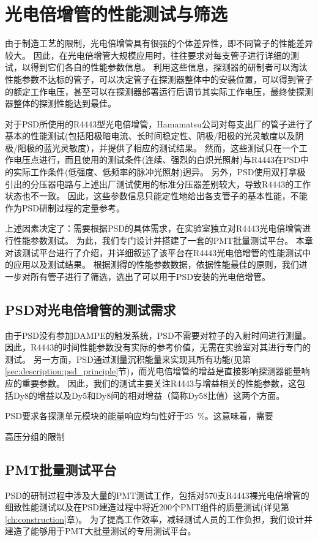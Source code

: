 \chapter{光电倍增管的性能测试与筛选}
\label{ch:pmt_test}
由于制造工艺的限制，光电倍增管具有很强的个体差异性，即不同管子的性能差异较大。
因此，在光电倍增管大规模应用时，往往要求对每支管子进行详细的测试，以得到它们各自的性能参数信息。
利用这些信息，探测器的研制者可以淘汰性能参数不达标的管子，可以决定管子在探测器整体中的安装位置，可以得到管子的额定工作电压，甚至可以在探测器部署运行后调节其实际工作电压，最终使探测器整体的探测性能达到最佳。

对于PSD所使用的R4443型光电倍增管，Hamamatsu公司对每支出厂的管子进行了基本的性能测试(包括阳极暗电流、长时间稳定性、阴极/阳极的光灵敏度以及阴极/阳极的蓝光灵敏度），并提供了相应的测试结果。
然而，这些测试只在一个工作电压点进行，而且使用的测试条件(连续、强烈的白炽光照射)与R4443在PSD中的实际工作条件(低强度、低频率的脉冲光照射)迥异。
另外，PSD使用双打拿极引出的分压器电路与上述出厂测试使用的标准分压器差别较大，导致R4443的工作状态也不一致。
因此，这些参数信息只能定性地给出各支管子的基本性能，不能作为PSD研制过程的定量参考。

上述因素决定了：需要根据PSD的具体需求，在实验室独立对R4443光电倍增管进行性能参数测试。
为此，我们专门设计并搭建了一套的PMT批量测试平台。
本章对该测试平台进行了介绍，并详细叙述了该平台在R4443光电倍增管的性能测试中的应用以及测试结果。
根据测得的性能参数数据，依据性能最佳的原则，我们进一步对所有管子进行了筛选，选出了可以用于PSD安装的光电倍增管。

\section{PSD对光电倍增管的测试需求}
由于PSD没有参加DAMPE的触发系统，PSD不需要对粒子的入射时间进行测量。
因此，R4443的时间性能参数没有实际的参考价值，无需在实验室对其进行专门的测试。
另一方面，PSD通过测量沉积能量来实现其所有功能(见第\ref{sec:description:psd_principle}节)，而光电倍增管的增益是直接影响探测器能量响应的重要参数。
因此，我们的测试主要关注R4443与增益相关的性能参数，这包括Dy8的增益以及Dy5和Dy8间的相对增益（简称Dy58比值）这两个方面。

PSD要求各探测单元模块的能量响应均匀性好于\SI{25}{\percent}。这意味着，需要

高压分组的限制

\section{PMT批量测试平台}
\label{sec:pmt_test:testbench}
PSD的研制过程中涉及大量的PMT测试工作，包括对570支R4443裸光电倍增管的细致性能测试以及在PSD建造过程中将近200个PMT组件的质量测试(详见第\ref{ch:construction}章)。
为了提高工作效率，减轻测试人员的工作负担，我们设计并建造了能够用于PMT大批量测试的专用测试平台。

